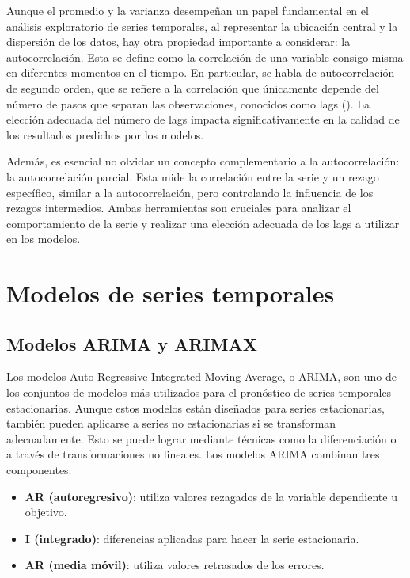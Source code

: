 \documentclass[12pt,a4paper]{report}
\begin{document}
Aunque el promedio y la varianza desempeñan un papel fundamental en el análisis exploratorio de series temporales, al representar la ubicación central y la dispersión de los datos, hay otra propiedad importante a considerar: la autocorrelación. Esta se define como la correlación de una variable consigo misma en diferentes momentos en el tiempo. En particular, se habla de autocorrelación de segundo orden, que se refiere a la correlación que únicamente depende del número de pasos que separan las observaciones, conocidos como lags (\cite{alvaroTruchado2024}). La elección adecuada del número de lags impacta significativamente en la calidad de los resultados predichos por los modelos.

Además, es esencial no olvidar un concepto complementario a la autocorrelación: la autocorrelación parcial. Esta mide la correlación entre la serie y un rezago específico, similar a la autocorrelación, pero controlando la influencia de los rezagos intermedios. Ambas herramientas son cruciales para analizar el comportamiento de la serie y realizar una elección adecuada de los lags a utilizar en los modelos.


\section{Modelos de series temporales}

\subsection{Modelos ARIMA y ARIMAX}

Los modelos Auto-Regressive Integrated Moving Average, o ARIMA, son uno de los conjuntos de modelos más utilizados para el pronóstico de series temporales estacionarias. Aunque estos modelos están diseñados para series estacionarias, también pueden aplicarse a series no estacionarias si se transforman adecuadamente. Esto se puede lograr mediante técnicas como la diferenciación o a través de transformaciones no lineales. Los modelos ARIMA combinan tres componentes:

\begin{itemize}
    \item \textbf{AR (autoregresivo)}: utiliza valores rezagados de la variable dependiente u objetivo.

    \item \textbf{I (integrado)}: diferencias aplicadas para hacer la serie estacionaria.

    \item \textbf{AR (media móvil)}: utiliza valores retrasados de los errores.
\end{itemize}
\end{document}
